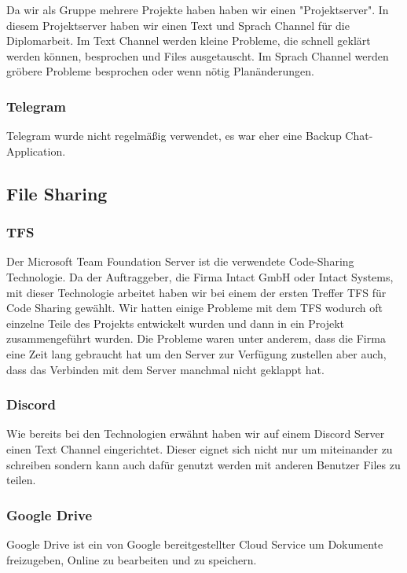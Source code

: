 Da wir als Gruppe mehrere Projekte haben haben wir einen "Projektserver". In diesem Projektserver haben wir einen Text und Sprach Channel für die Diplomarbeit. Im Text Channel werden kleine Probleme, die schnell geklärt werden können, besprochen und Files ausgetauscht. Im Sprach Channel werden gröbere Probleme besprochen oder wenn nötig Planänderungen. 


\subsubsection {Telegram}
Telegram wurde nicht regelmäßig verwendet, es war eher eine Backup Chat-Application. 

\subsection{File Sharing}
\subsubsection {TFS}
Der Microsoft Team Foundation Server ist die verwendete Code-Sharing Technologie. Da der Auftraggeber, die Firma Intact GmbH oder Intact Systems, mit dieser Technologie arbeitet haben wir bei einem der ersten Treffer TFS für Code Sharing gewählt. Wir hatten einige Probleme mit dem TFS wodurch oft einzelne Teile des Projekts entwickelt wurden und dann in ein Projekt zusammengeführt wurden. Die Probleme waren unter anderem, dass die Firma eine Zeit lang gebraucht hat um den Server zur Verfügung zustellen aber auch, dass das Verbinden mit dem Server manchmal nicht geklappt hat. 


\subsubsection {Discord}
Wie bereits bei den Technologien erwähnt haben wir auf einem Discord Server einen Text Channel eingerichtet. Dieser eignet sich nicht nur um miteinander zu schreiben sondern kann auch dafür genutzt werden mit anderen Benutzer Files zu teilen. 
\subsubsection {Google Drive}
Google Drive ist ein von Google bereitgestellter Cloud Service um Dokumente freizugeben, Online zu bearbeiten und zu speichern.

